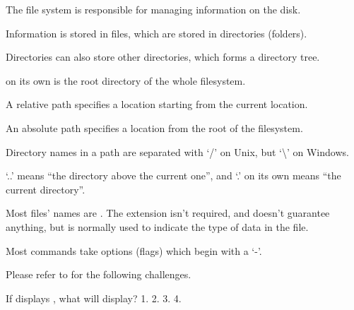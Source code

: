 \begin{keypoints}
\begin{swcitemize}
\item
  The file system is responsible for managing information on the disk.
\item
  Information is stored in files, which are stored in directories
  (folders).
\item
  Directories can also store other directories, which forms a directory
  tree.
\item
  \code{/} on its own is the root directory of the whole filesystem.
\item
  A relative path specifies a location starting from the current
  location.
\item
  An absolute path specifies a location from the root of the filesystem.
\item
  Directory names in a path are separated with `/' on Unix, but
  `\textbackslash{}' on Windows.
\item
  `..' means ``the directory above the current one'', and `.' on its own
  means ``the current directory''.
\item
  Most files' names are . The extension
  isn't required, and doesn't guarantee anything, but is normally used
  to indicate the type of data in the file.
\item
  Most commands take options (flags) which begin with a `-'.
\end{swcitemize}
\end{keypoints}

Please refer to  for the following challenges.


\begin{challenge}

  If  displays , what will
   display? 1.
   2.
   3.
   4.

\end{challenge}

